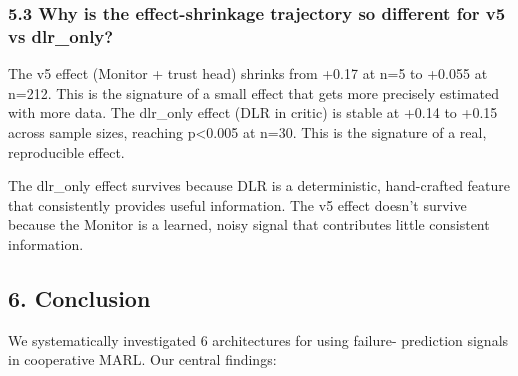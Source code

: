 \documentclass[
]{article}
\begin{document}
\subsubsection{5.3 Why is the effect-shrinkage trajectory so different
for v5 vs
dlr\_only?}\label{why-is-the-effect-shrinkage-trajectory-so-different-for-v5-vs-dlr_only}

The v5 effect (Monitor + trust head) shrinks from +0.17 at n=5 to +0.055
at n=212. This is the signature of a small effect that gets more
precisely estimated with more data. The dlr\_only effect (DLR in critic)
is stable at +0.14 to +0.15 across sample sizes, reaching
p\textless0.005 at n=30. This is the signature of a real, reproducible
effect.

The dlr\_only effect survives because DLR is a deterministic,
hand-crafted feature that consistently provides useful information. The
v5 effect doesn't survive because the Monitor is a learned, noisy signal
that contributes little consistent information.

\subsection{6. Conclusion}\label{conclusion}

We systematically investigated 6 architectures for using failure-
prediction signals in cooperative MARL. Our central findings:
\end{document}
